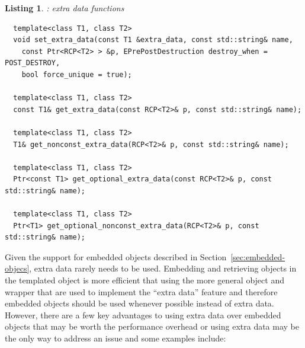\documentclass[pdf,ps2pdf,11pt]{SANDreport}
\newtheorem{listing}{Listing}
\begin{document}
\begin{listing}:  {} extra data functions \\
\label{listing:RCP-extra-data}
{\small\begin{verbatim}
  template<class T1, class T2>
  void set_extra_data(const T1 &extra_data, const std::string& name,
    const Ptr<RCP<T2> > &p, EPrePostDestruction destroy_when = POST_DESTROY,
    bool force_unique = true);
  
  template<class T1, class T2> 
  const T1& get_extra_data(const RCP<T2>& p, const std::string& name);
  
  template<class T1, class T2>
  T1& get_nonconst_extra_data(RCP<T2>& p, const std::string& name);
  
  template<class T1, class T2>
  Ptr<const T1> get_optional_extra_data(const RCP<T2>& p, const std::string& name);
  
  template<class T1, class T2>
  Ptr<T1> get_optional_nonconst_extra_data(RCP<T2>& p, const std::string& name);
\end{verbatim}}
\end{listing}

Given the support for embedded objects described in
Section~\ref{sec:embedded-objecs}, extra data rarely needs to be used.
Embedding and retrieving objects in the templated {}
object is more efficient that using the more general {}
object and {} wrapper that are used to implement the ``extra
data'' feature and therefore embedded objects should be used whenever
possible instead of extra data.  However, there are a few key
advantages to using extra data over embedded objects that may be worth
the performance overhead or using extra data may be the only way to
address an issue and some examples include:
\end{document}
